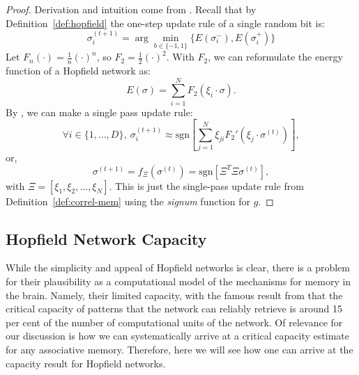 \documentclass{article}
\theoremstyle{definition}
\begin{document}
\begin{proof}
  Derivation and intuition come from \textcite{krotov_modern_2025}.
  Recall that by Definition~\ref{def:hopfield} the one-step update rule of a
  single random bit is:
  \begin{equation}\label{proof:random-update}
    \sigma_i^{(t+1)} = \arg\min_{b \in \{-1, 1\}} \{ E(\sigma_i^-),
    E(\sigma_i^+) \}
  \end{equation}
  Let $F_n (\cdot) = \frac{1}{n} (\cdot)^n$, so $F_2 = \frac{1}{2} (\cdot)^2$.
  With $F_2$, we can reformulate the energy function of a Hopfield network as:
  \begin{equation}\label{hopfield:f_n}
    E(\sigma) = \sum^N_{i=1} F_2 (\xi_i \cdot \sigma).
  \end{equation}
  By \textcite{krotov_modern_2025}, we can make a single pass update rule:
  \begin{equation}\label{eq:krotov-energy-deriv}
    \forall i \in \{1, \dots, D\},~\sigma_i^{(t+1)} \approx
    \text{sgn} \left[ \sum^N_{j=1} \xi_{ji} F_2' \left( \xi_j \cdot
    \sigma^{(t)}  \right) \right],
  \end{equation}
  or,
  \begin{equation}
    \sigma^{(t+1)} = f_\Xi (\sigma^{(t)}) = \text{sgn} \left[ \Xi^T
    \Xi \sigma^{(t)} \right],
  \end{equation}
  with $\Xi = [\xi_1, \xi_2, \dots, \xi_N]$.
  This is just the single-pass update rule from Definition~\ref{def:correl-mem}
  using the \textit{signum} function for $g$.
\end{proof}

\subsection{Hopfield Network Capacity}\label{sec:hopfield-cap}

While the simplicity and appeal of Hopfield networks is clear, there
is a problem
for their plausibility as a computational model of the mechanisms for memory in
the brain. Namely, their limited capacity, with the famous result from
\textcite{hopfield_neural_1982} that the critical capacity of patterns
that the network can reliably retrieve is around 15 per cent of the
number of computational
units of the network. Of relevance for our discussion is how we can
systematically
arrive at a critical capacity estimate for any associative memory. Therefore,
here we will see how one can arrive at the capacity result for
Hopfield networks.
\end{document}
